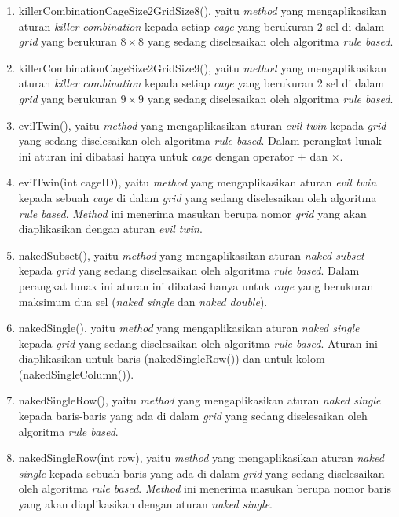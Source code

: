 \begin{enumerate}
\item killerCombinationCageSize2GridSize8(), yaitu \textit{method} yang mengaplikasikan aturan \textit{killer combination} kepada setiap \textit{cage} yang berukuran 2 sel di dalam \textit{grid} yang berukuran \begin{math}8 \times 8\end{math} yang sedang diselesaikan oleh algoritma \textit{rule based}.
\item killerCombinationCageSize2GridSize9(), yaitu \textit{method} yang mengaplikasikan aturan \textit{killer combination} kepada setiap \textit{cage} yang berukuran 2 sel di dalam \textit{grid} yang berukuran \begin{math}9 \times 9\end{math} yang sedang diselesaikan oleh algoritma \textit{rule based}.
\item evilTwin(), yaitu \textit{method} yang mengaplikasikan aturan \textit{evil twin} kepada \textit{grid} yang sedang diselesaikan oleh algoritma \textit{rule based}. Dalam perangkat lunak ini aturan ini dibatasi hanya untuk \textit{cage} dengan operator + dan \begin{math}\times\end{math}.
\item evilTwin(int cageID), yaitu \textit{method} yang mengaplikasikan aturan \textit{evil twin} kepada sebuah \textit{cage} di dalam \textit{grid} yang sedang diselesaikan oleh algoritma \textit{rule based}. \textit{Method} ini menerima masukan berupa nomor \textit{grid} yang akan diaplikasikan dengan aturan \textit{evil twin}.
\item nakedSubset(), yaitu \textit{method} yang mengaplikasikan aturan \textit{naked subset} kepada \textit{grid} yang sedang diselesaikan oleh algoritma \textit{rule based}. Dalam perangkat lunak ini aturan ini dibatasi hanya untuk \textit{cage} yang berukuran maksimum dua sel (\textit{naked single} dan \textit{naked double}).
\item nakedSingle(), yaitu \textit{method} yang mengaplikasikan aturan \textit{naked single} kepada \textit{grid} yang sedang diselesaikan oleh algoritma \textit{rule based}. Aturan ini diaplikasikan untuk baris (nakedSingleRow()) dan untuk kolom (nakedSingleColumn()).
\item nakedSingleRow(), yaitu \textit{method} yang mengaplikasikan aturan \textit{naked single} kepada baris-baris yang ada di dalam \textit{grid} yang sedang diselesaikan oleh algoritma \textit{rule based}.
\item nakedSingleRow(int row), yaitu \textit{method} yang mengaplikasikan aturan \textit{naked single} kepada sebuah baris yang ada di dalam \textit{grid} yang sedang diselesaikan oleh algoritma \textit{rule based}. \textit{Method} ini menerima masukan berupa nomor baris yang akan diaplikasikan dengan aturan \textit{naked single}.

\end{enumerate}
